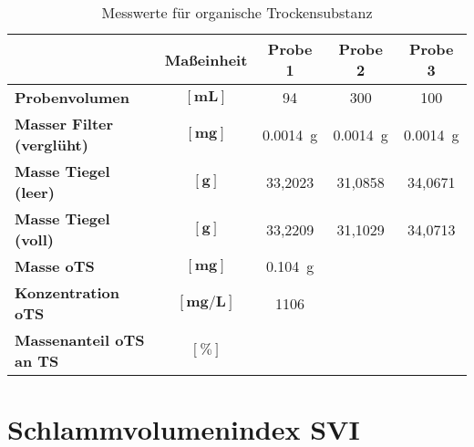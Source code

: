 \vspace*{-2.5mm}
\renewcommand{\arraystretch}{1.2}
\begin{table}[h!]
	\centering
	\caption{Messwerte für organische Trockensubstanz}
	\label{tab:ots}
	\begin{tabulary}{1.7\textwidth}{L|C|CCC}
		\hline
		& \textbf{Maßeinheit}&	\textbf{Probe 1} & \textbf{Probe 2} & \textbf{Probe 3}  \\ 
		\hline
		\textbf{Probenvolumen}& $\boldsymbol{\left[\si{\milli \liter}\right]}$ & 94 	& 300 	& 100\\
		\textbf{Masser Filter (verglüht)} & $\boldsymbol{\left[\si{\milli \gram}\right]}$ & \SI{0,0014}{\gram}&\SI{0,0014}{\gram}&\SI{0,0014}{\gram}\\
		\textbf{Masse Tiegel (leer)} &  $\boldsymbol{\left[\si{\gram}\right]}$ & 33,2023 & 31,0858 & 34,0671\\
		\textbf{Masse Tiegel (voll)}& $\boldsymbol{\left[\si{\gram}\right]}$	& 33,2209 & 31,1029 & 34,0713\\
		\hline
		\textbf{Masse oTS} & $\boldsymbol{\left[\si{\milli \gram}\right]}$& \SI{0,104}{\gram} &  & \\
		\hline
		\textbf{Konzentration oTS}&$\boldsymbol{\left[\si{\milli \gram \per \liter}\right]}$& 1106 &  &  \\
		\textbf{Massenanteil oTS an TS} & $\boldsymbol{\left[\%\right]}$&&&\\
		\hline
	\end{tabulary}
\end{table}
\FloatBarrier
\vspace*{-2.5mm}

\section{Schlammvolumenindex SVI}

